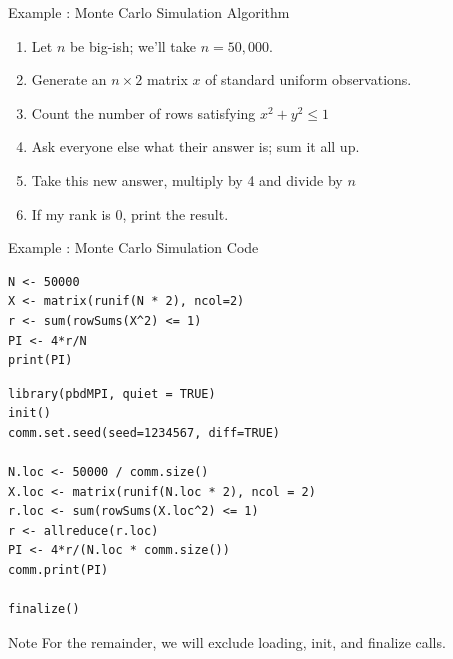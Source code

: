 \begin{frame}[fragile]
  \begin{block}{Example \showex :  Monte Carlo Simulation Algorithm}\pause
    \begin{enumerate}
     \item Let $n$ be big-ish; we'll take $n=50,000$.
     \item Generate an $n\times 2$ matrix $x$ of standard uniform observations.
     \item Count the number of rows satisfying $x^2 + y^2 \leq 1$
     \item Ask everyone else what their answer is; sum it all up.
     \item Take this new answer, multiply by 4 and divide by $n$
     \item If my rank is 0, print the result.
    \end{enumerate}
  \end{block}
\end{frame}

\begin{frame}[fragile]
  \begin{exampleblock}{Example \showex :  Monte Carlo Simulation Code}\pause
\begin{lstlisting}[title=Serial Code]
N <- 50000
X <- matrix(runif(N * 2), ncol=2)
r <- sum(rowSums(X^2) <= 1)
PI <- 4*r/N
print(PI)
\end{lstlisting}

\begin{lstlisting}[title=Parallel Code]
library(pbdMPI, quiet = TRUE)
init()
comm.set.seed(seed=1234567, diff=TRUE)

N.loc <- 50000 / comm.size()
X.loc <- matrix(runif(N.loc * 2), ncol = 2)
r.loc <- sum(rowSums(X.loc^2) <= 1)
r <- allreduce(r.loc)
PI <- 4*r/(N.loc * comm.size())
comm.print(PI)

finalize()
\end{lstlisting}
  \end{exampleblock}
\end{frame}

\begin{frame}[fragile]
  \begin{block}{Note}\pause
    For the remainder, we will exclude loading, init, and finalize calls.
  \end{block}
\end{frame}



